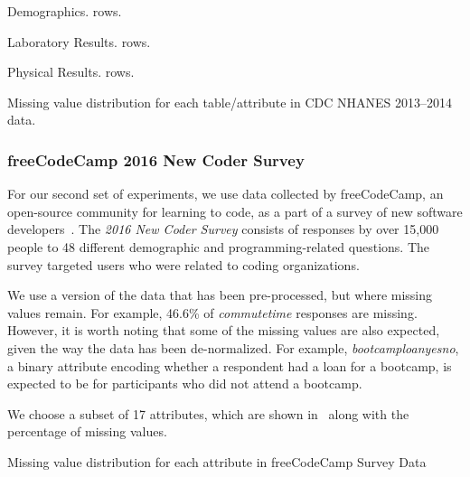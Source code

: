 \begin{table}
  \centering
  \begin{subtable}{0.5\textwidth}
    \centering
    
    \caption{Demographics. \demorows{} rows.}
  \end{subtable}
  \par\medskip
  \begin{subtable}{0.5\textwidth}
    \centering
    
    \caption{Laboratory Results. \labexrows{} rows.}
  \end{subtable}
  \par\medskip  
  \begin{subtable}{0.5\textwidth}
    \centering
    
    \caption{Physical Results. \labexrows{} rows.}
  \end{subtable}
  \par\medskip  
  \caption{Missing value distribution for each table/attribute in CDC NHANES 2013--2014 data.}\label{table:nhanes-description} 
\end{table}

\subsubsection{freeCodeCamp 2016 New Coder Survey}
For our second set of experiments, we use data collected by freeCodeCamp, an open-source
community for learning to code, as a part of a survey of new software
developers~\cite{fcc-data}.  The \textit{2016 New Coder Survey} consists of responses by
over 15,000 people to 48 different demographic and programming-related questions.  The
survey targeted users who were related to coding organizations.

We use a version of the data that has been pre-processed, but where missing values remain.
For example, 46.6\% of \textit{commutetime} responses are missing. However, it is worth
noting that some of the missing values are also expected, given the way the data has been
de-normalized. For example, \textit{bootcamploanyesno}, a binary attribute encoding whether
a respondent had a loan for a bootcamp, is expected to be \nullv{} for participants who did not
attend a bootcamp.

We choose a subset of 17 attributes, which are shown in~ along
with the percentage of missing values.

\begin{table}
  \centering
  
  \caption{Missing value distribution for each attribute in freeCodeCamp Survey Data}\label{table:fcc-description} 
\end{table}

